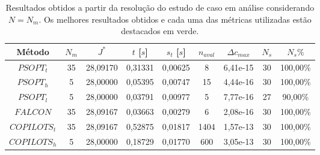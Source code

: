\begin{table}
	\centering
	\caption[Resultados obtidos a partir da resolução do estudo de caso em análise considerando $ N = N_m $]{Resultados obtidos a partir da resolução do estudo de caso em análise  considerando $ N = N_m $. Os melhores resultados obtidos e cada uma das métricas utilizadas estão destacados em verde.}
	\label{tab:integrador:dadosBrutos}
	\begin{tabular}{|c|c|c|c|c|c|c|c|c|}
		\hline
		Método       & $N_m$                     & $J^*$                            & $t$ {[}$s${]}                   & $s_t$ {[}$s${]} & $n_{aval}$                & $\Delta c_{max}$ & $N_s$ & $N_s\%$                          \\ \hline
		$PSOPT_t$    & 35                        & 28,09170                         & 0,31331                         & 0,00625         & 8                         & 6,41e-15         & 30    & \cellcolor[HTML]{32CB00}100,00\% \\ \hline
		$PSOPT_h$    & \cellcolor[HTML]{32CB00}5 & \cellcolor[HTML]{32CB00}28,00000 & 0,05395                         & 0,00747         & 15                        & 4,44e-16         & 30    & \cellcolor[HTML]{32CB00}100,00\% \\ \hline
		$PSOPT_l$    & \cellcolor[HTML]{32CB00}5 & \cellcolor[HTML]{32CB00}28,00000 & 0,03791                         & 0,00977         & \cellcolor[HTML]{32CB00}5 & 7,77e-16         & 27    & 90,00\%                          \\ \hline
		$FALCON$     & 35                        & 28,09167                         & \cellcolor[HTML]{32CB00}0,03663 & 0,00279         & 6                         & 2,08e-16         & 30    & \cellcolor[HTML]{32CB00}100,00\% \\ \hline
		$COPILOTS_t$ & 35                        & 28,09167                         & 0,52875                         & 0,01817         & 1404                      & 1,57e-13         & 30    & \cellcolor[HTML]{32CB00}100,00\% \\ \hline
		$COPILOTS_h$ & \cellcolor[HTML]{32CB00}5 & \cellcolor[HTML]{32CB00}28,00000 & 0,18729                         & 0,01770         & 600                       & 3,05e-13         & 30    & \cellcolor[HTML]{32CB00}100,00\% \\ \hline
	\end{tabular}
\end{table}
